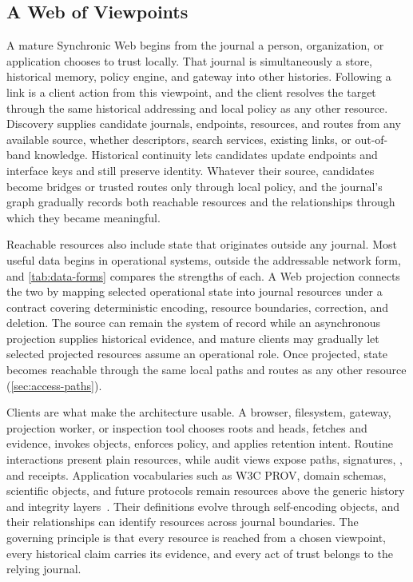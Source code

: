 \subsection{A Web of Viewpoints}

A mature Synchronic Web begins from the journal a person, organization, or application chooses to trust locally. That journal is simultaneously a store, historical memory, policy engine, and gateway into other histories. Following a link is a client action from this viewpoint, and the client resolves the target through the same historical addressing and local policy as any other resource. Discovery supplies candidate journals, endpoints, resources, and routes from any available source, whether descriptors, search services, existing links, or out-of-band knowledge. Historical continuity lets candidates update endpoints and interface keys and still preserve identity. Whatever their source, candidates become bridges or trusted routes only through local policy, and the journal's graph gradually records both reachable resources and the relationships through which they became meaningful.

Reachable resources also include state that originates outside any journal. Most useful data begins in operational systems, outside the addressable network form, and \cref{tab:data-forms} compares the strengths of each. A Web projection connects the two by mapping selected operational state into journal resources under a contract covering deterministic encoding, resource boundaries, correction, and deletion. The source can remain the system of record while an asynchronous projection supplies historical evidence, and mature clients may gradually let selected projected resources assume an operational role. Once projected, state becomes reachable through the same local paths and routes as any other resource (\cref{sec:access-paths}).

\begin{table}[htbp]
  \centering
  \small
  
  \caption{Complementary Data Forms}
  \label{tab:data-forms}
\end{table}

Clients are what make the architecture usable. A browser, filesystem, gateway, projection worker, or inspection tool chooses roots and heads, fetches and  evidence, invokes objects, enforces policy, and applies retention intent. Routine interactions present plain resources, while audit views expose paths, signatures, , and receipts. Application vocabularies such as W3C PROV, domain schemas, scientific objects, and future protocols remain resources above the generic history and integrity layers~\cite{Moreau2010open,Moreau2013prov}. Their definitions evolve through self-encoding objects, and their relationships can identify resources across journal boundaries. The governing principle is that every resource is reached from a chosen viewpoint, every historical claim carries its evidence, and every act of trust belongs to the relying journal.